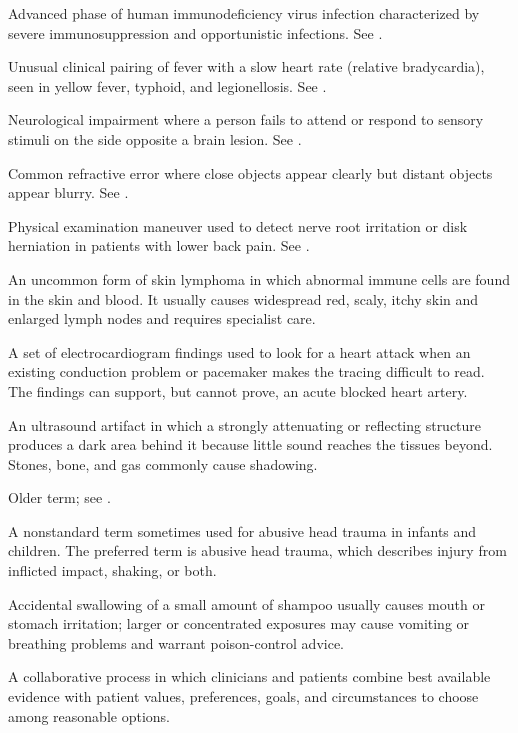  Advanced phase of human immunodeficiency virus infection characterized by severe immunosuppression and opportunistic infections. See .

 Unusual clinical pairing of fever with a slow heart rate (relative bradycardia), seen in yellow fever, typhoid, and legionellosis. See .

 Neurological impairment where a person fails to attend or respond to sensory stimuli on the side opposite a brain lesion. See .

 Common refractive error where close objects appear clearly but distant objects appear blurry. See .

 Physical examination maneuver used to detect nerve root irritation or disk herniation in patients with lower back pain. See .

 An uncommon form of skin lymphoma in which abnormal immune cells are found in the skin and blood. It usually causes widespread red, scaly, itchy skin and enlarged lymph nodes and requires specialist care.

 A set of electrocardiogram findings used to look for a heart attack when an existing conduction problem or pacemaker makes the tracing difficult to read. The findings can support, but cannot prove, an acute blocked heart artery.

 An ultrasound artifact in which a strongly attenuating or reflecting structure produces a dark area behind it because little sound reaches the tissues beyond. Stones, bone, and gas commonly cause shadowing.

 Older term; see .

 A nonstandard term sometimes used for abusive head trauma in infants and children. The preferred term is abusive head trauma, which describes injury from inflicted impact, shaking, or both.

 Accidental swallowing of a small amount of shampoo usually causes mouth or stomach irritation; larger or concentrated exposures may cause vomiting or breathing problems and warrant poison-control advice.

 A collaborative process in which clinicians and patients combine best available evidence
with patient values, preferences, goals, and circumstances to choose among reasonable
options.

